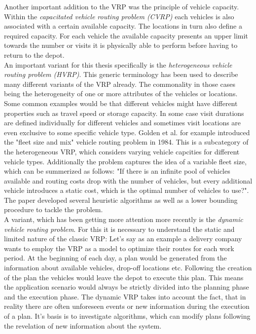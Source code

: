Another important addition to the VRP was the principle of vehicle capacity. Within the \textit{capacitated vehicle routing problem (CVRP)} each vehicles is also associated with a certain available capacity. The locations in turn also define a required capacity. For each vehicle the available capacity presents an upper limit towards the number or visits it is physically able to perform before having to return to the depot.\\
An important variant for this thesis specifically is the \textit{heterogeneous vehicle routing problem (HVRP)}. This generic terminology has been used to describe many different variants of the VRP already. The commonality in those cases being the heterogeneity of one or more attributes of the vehicles or locations. Some common examples would be that different vehicles might have different properties such as travel speed or storage capacity. In some case visit durations are defined individually for different vehicles and sometimes visit locations are even exclusive to some specific vehicle type. Golden et al. \cite{golden_fleet_1984} for example introduced the "fleet size and mix" vehicle routing problem in 1984. This is a subcategory of the heterogeneous VRP, which considers varying vehicle capcities for different vehicle types. Additionally the problem captures the idea of a variable fleet size, which can be summerized as follows: "If there is an infinite pool of vehicles available and routing costs drop with the number of vehicles, but every additional vehicle introduces a static cost, which is the optimal number of vehicles to use?". The paper developed several heuristic algorithms as well as a lower bounding procedure to tackle the problem.\\
A variant, which has been getting more attention more recently is the \textit{dynamic vehicle routing problem}. For this it is necessary to understand the static and limited nature of the classic VRP: Let's say as an example a delivery company wants to employ the VRP as a model to optimize their routes for each work period. At the beginning of each day, a plan would be generated from the information about available vehicles, drop-off locations etc. Following the creation of the plan the vehicles would leave the depot to execute this plan. This means the application scenario would always be strictly divided into the planning phase and the execution phase. The dynamic VRP takes into account the fact, that in reality there are often unforeseen events or new information during the execution of a plan. It's basis is to investigate algorithms, which can modify plans following the revelation of new information about the system.

